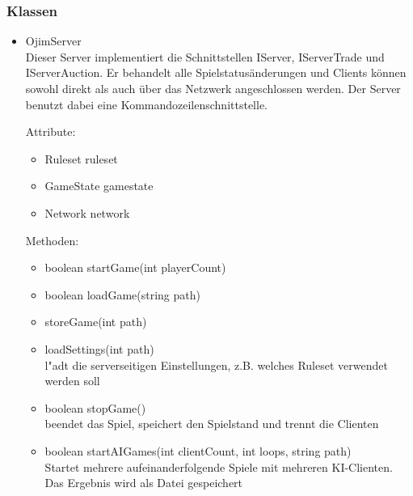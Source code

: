 \documentclass[a4paper,10pt]{article}
\begin{document}
\subsubsection{Klassen}
\begin{itemize}
\item OjimServer \\
Dieser Server implementiert die Schnittstellen IServer, IServerTrade und IServerAuction. Er behandelt alle Spielstatusänderungen und Clients können sowohl direkt als auch über das Netzwerk angeschlossen werden. Der Server benutzt dabei eine Kommandozeilenschnittstelle.

Attribute:
\begin{itemize}
\item Ruleset ruleset
\item GameState gamestate
\item Network network
\end{itemize}

Methoden:
\begin{itemize}
\item boolean startGame(int playerCount) 
\item boolean loadGame(string path)
\item storeGame(int path)
\item loadSettings(int path)
\\l"adt die serverseitigen Einstellungen, z.B. welches Ruleset verwendet werden soll
\item boolean stopGame()
\\beendet das Spiel, speichert den Spielstand und trennt die Clienten
\item boolean startAIGames(int clientCount, int loops, string path)
\\Startet mehrere aufeinanderfolgende Spiele mit mehreren KI-Clienten. Das Ergebnis wird als Datei gespeichert
\end{itemize} %
\end{itemize} %
\end{document}
